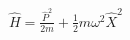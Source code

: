 \documentclass[preview]{standalone}
\begin{document}
\begin{center}
$\hat{H} = \frac{\hat{P}^2}{2m} + \frac{1}{2}m\omega^2 \hat{X}^2$
\end{center}
\end{document}
